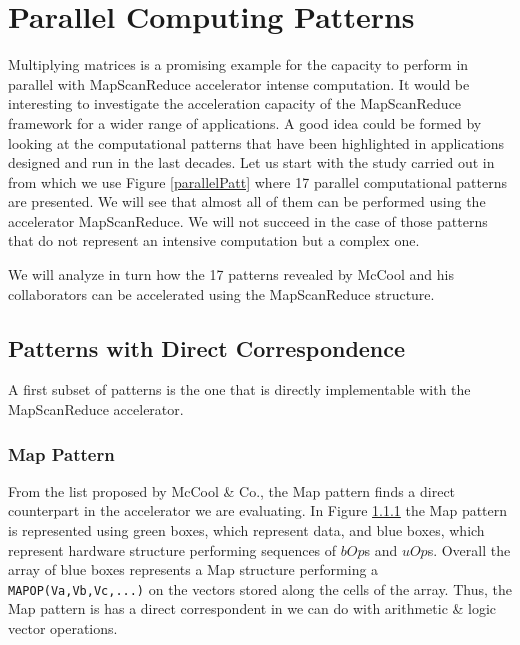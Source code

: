\section{Parallel Computing Patterns}

Multiplying matrices is a promising example for the capacity to perform in parallel with MapScanReduce accelerator intense computation. It would be interesting to investigate the acceleration capacity of the MapScanReduce framework for a wider range of applications. A good idea could be formed by looking at the computational patterns that have been highlighted in applications designed and run in the last decades. Let us start with the study carried out in \cite{McCool12} from which we use Figure \ref{parallelPatt} where 17 parallel computational patterns are presented. We will see that almost all of them can be performed using the accelerator MapScanReduce. We will not succeed in the case of those patterns that do not represent an intensive computation but a complex one.


We will analyze in turn how the 17 patterns revealed by McCool and his collaborators can be accelerated using the MapScanReduce structure.

\subsection{Patterns with Direct Correspondence}

A first subset of patterns is the one that is directly implementable with the MapScanReduce accelerator.

\subsubsection{Map Pattern}

From the list proposed by McCool \& Co., the Map pattern finds a direct counterpart in the accelerator we are evaluating. In Figure \ref{} the Map pattern is represented using green boxes, which represent data, and blue boxes, which represent hardware structure performing sequences of $bOp$s and $uOp$s. Overall the array of blue boxes represents a Map structure performing a {\tt MAPOP(Va,Vb,Vc,...)} on the vectors stored along the cells of the array. Thus, the Map pattern is has a direct correspondent in we can do with arithmetic \& logic vector operations. 

